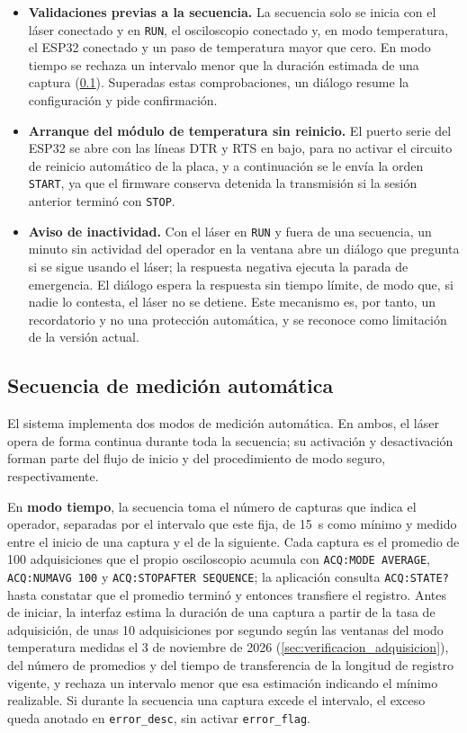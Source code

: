 \begin{itemize}
  \item \textbf{Validaciones previas a la secuencia.} La secuencia solo
    se inicia con el láser conectado y en \texttt{RUN}, el osciloscopio
    conectado y, en modo temperatura, el ESP32 conectado y un paso de
    temperatura mayor que cero. En modo tiempo se rechaza un intervalo
    menor que la duración estimada de una captura
    (\cref{sec:secuencia}). Superadas estas comprobaciones, un diálogo
    resume la configuración y pide confirmación.

  \item \textbf{Arranque del módulo de temperatura sin reinicio.} El
    puerto serie del ESP32 se abre con las líneas DTR y RTS en bajo,
    para no activar el circuito de reinicio automático de la placa, y
    a continuación se le envía la orden \texttt{START}, ya que el
    firmware conserva detenida la transmisión si la sesión anterior
    terminó con \texttt{STOP}.

  \item \textbf{Aviso de inactividad.} Con el láser en \texttt{RUN} y
    fuera de una secuencia, un minuto sin actividad del operador en la
    ventana abre un diálogo que pregunta si se sigue usando el láser;
    la respuesta negativa ejecuta la parada de emergencia. El diálogo
    espera la respuesta sin tiempo límite, de modo que, si nadie lo
    contesta, el láser no se detiene. Este mecanismo es, por tanto, un
    recordatorio y no una protección automática, y se reconoce como
    limitación de la versión actual.
\end{itemize}

\subsection{Secuencia de medición automática}
\label{sec:secuencia}

El sistema implementa dos modos de medición automática. En ambos, el
láser opera de forma continua durante toda la secuencia; su activación
y desactivación forman parte del flujo de inicio y del procedimiento de
modo seguro, respectivamente.

En \textbf{modo tiempo}, la secuencia toma el número de capturas que
indica el operador, separadas por el intervalo que este fija, de
\SI{15}{\second} como mínimo y medido entre el inicio de una captura y
el de la siguiente. Cada captura es el promedio de 100 adquisiciones
que el propio osciloscopio acumula con \texttt{ACQ:MODE AVERAGE},
\texttt{ACQ:NUMAVG 100} y \texttt{ACQ:STOPAFTER SEQUENCE}; la
aplicación consulta \texttt{ACQ:STATE?} hasta constatar que el
promedio terminó y entonces transfiere el registro. Antes de iniciar,
la interfaz estima la duración de una captura a partir de la tasa de
adquisición, de unas 10 adquisiciones por segundo según las ventanas
del modo temperatura medidas el 3 de noviembre de 2026
(\cref{sec:verificacion_adquisicion}), del
número de promedios y del tiempo de transferencia de la longitud de
registro vigente, y rechaza un intervalo menor que esa estimación
indicando el mínimo realizable. Si durante la secuencia una captura
excede el intervalo, el exceso queda anotado en \texttt{error\_desc},
sin activar \texttt{error\_flag}.

